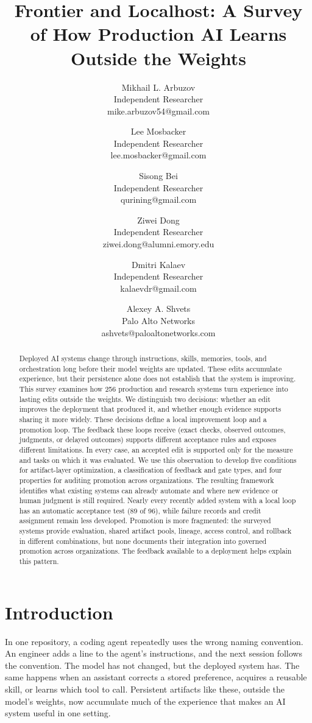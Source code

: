 \documentclass[
  11pt,
]{article}
\title{Frontier and Localhost: A Survey of How Production AI Learns Outside the Weights}
\author{Mikhail L. Arbuzov\\
Independent Researcher\\
mike.arbuzov54@gmail.com \and Lee Mosbacker\\
Independent Researcher\\
lee.mosbacker@gmail.com \and Sisong Bei\\
Independent Researcher\\
qurining@gmail.com \and Ziwei Dong\\
Independent Researcher\\
ziwei.dong@alumni.emory.edu \and Dmitri Kalaev\\
Independent Researcher\\
kalaevdr@gmail.com \and Alexey A. Shvets\\
Palo Alto Networks\\
ashvets@paloaltonetworks.com}
\date{}
\newcounter{none} %
\begin{document}
\maketitle
\begin{abstract}
Deployed AI systems change through instructions, skills, memories, tools, and orchestration long before their model weights are updated. These edits accumulate experience, but their persistence alone does not establish that the system is improving. This survey examines how 256 production and research systems turn experience into lasting edits outside the weights. We distinguish two decisions: whether an edit improves the deployment that produced it, and whether enough evidence supports sharing it more widely. These decisions define a local improvement loop and a promotion loop. The feedback these loops receive (exact checks, observed outcomes, judgments, or delayed outcomes) supports different acceptance rules and exposes different limitations. In every case, an accepted edit is supported only for the measure and tasks on which it was evaluated. We use this observation to develop five conditions for artifact-layer optimization, a classification of feedback and gate types, and four properties for auditing promotion across organizations. The resulting framework identifies what existing systems can already automate and where new evidence or human judgment is still required. Nearly every recently added system with a local loop has an automatic acceptance test (89 of 96), while failure records and credit assignment remain less developed. Promotion is more fragmented: the surveyed systems provide evaluation, shared artifact pools, lineage, access control, and rollback in different combinations, but none documents their integration into governed promotion across organizations. The feedback available to a deployment helps explain this pattern.
\end{abstract}

\section{Introduction}\label{sec:intro}

In one repository, a coding agent repeatedly uses the wrong naming convention. An engineer adds a line to the agent's instructions, and the next session follows the convention. The model has not changed, but the deployed system has. The same happens when an assistant corrects a stored preference, acquires a reusable skill, or learns which tool to call. Persistent artifacts like these, outside the model's weights, now accumulate much of the experience that makes an AI system useful in one setting.
\end{document}
